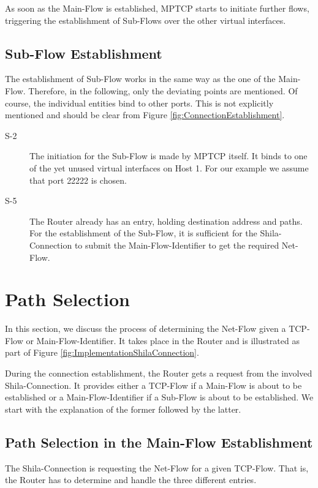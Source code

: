 As soon as the Main-Flow is established, MPTCP starts to initiate further flows, triggering the establishment of Sub-Flows over the other virtual interfaces.

\subsection*{Sub-Flow Establishment}

The establishment of Sub-Flow works in the same way as the one of the Main-Flow. Therefore, in the following, only the deviating points are mentioned. Of course, the individual entities bind to other ports. This is not explicitly mentioned and should be clear from Figure \ref{fig:ConnectionEstablishment}.

\begin{description}	
\item[S-2] The initiation for the Sub-Flow is made by MPTCP itself. It binds to one of the yet unused virtual interfaces on Host 1. For our example we assume that port {\footnotesize 22222} is chosen. 
\item[S-5] The Router already has an entry, holding destination address and paths. For the establishment of the Sub-Flow, it is sufficient for the Shila-Connection to submit the Main-Flow-Identifier to get the required Net-Flow.
\end{description}

\newpage
\section{Path Selection}
\label{sec:ImplementationPathSelection}

In this section, we discuss the process of determining the Net-Flow given a TCP-Flow or Main-Flow-Identifier. It takes place in the Router and is illustrated as part of Figure \ref{fig:ImplementationShilaConnection}.

During the connection establishment, the Router gets a request from the involved Shila-Connection. It provides either a TCP-Flow if a Main-Flow is about to be established or a Main-Flow-Identifier if a Sub-Flow is about to be established. We start with the explanation of the former followed by the latter.

\subsection*{Path Selection in the Main-Flow Establishment}

The Shila-Connection is requesting the Net-Flow for a given TCP-Flow. That is, the Router has to determine and handle the three different entries.


